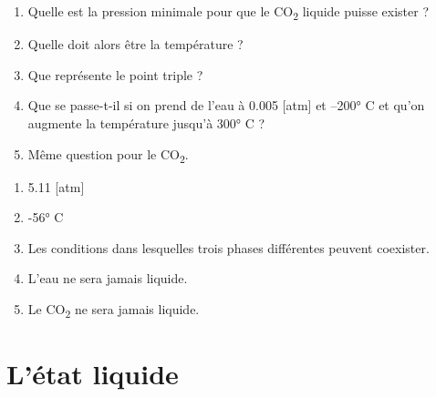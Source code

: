 \documentclass[
  11pt,
  french,
  a4paper,
  openany]{book}
\providecommand{\tightlist}{%
  \setlength{\itemsep}{0pt}\setlength{\parskip}{0pt}}
\begin{document}
\begin{Exercise}

\begin{enumerate}
\def\labelenumi{\arabic{enumi}.}
\tightlist
\item
  Quelle est la pression minimale pour que le CO\textsubscript{2} liquide puisse exister ?\\
\item
  Quelle doit alors être la température ?\\
\item
  Que représente le point triple ?\\
\item
  Que se passe-t-il si on prend de l'eau à 0.005 {[}atm{]} et --200° C et qu'on augmente la température jusqu'à 300° C ?\\
\item
  Même question pour le CO\textsubscript{2}.\\
\end{enumerate}


\end{Exercise}

\begin{Answer}

\begin{enumerate}
\def\labelenumi{\arabic{enumi}.}
\tightlist
\item
  5.11 {[}atm{]}
\item
  -56° C
\item
  Les conditions dans lesquelles trois phases différentes peuvent coexister.
\item
  L'eau ne sera jamais liquide.
\item
  Le CO\textsubscript{2} ne sera jamais liquide.
\end{enumerate}


\end{Answer}

\newpage

\hypertarget{luxe9tat-liquide}{%
\section{L'état liquide}\label{luxe9tat-liquide}}
\end{document}
